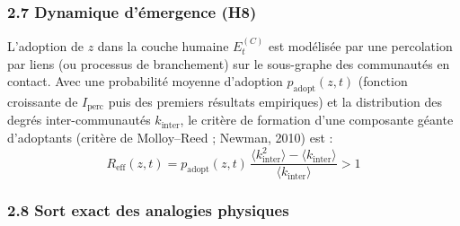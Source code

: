 \documentclass[a4paper,11pt]{article}
\begin{document}
\subsubsection*{2.7 Dynamique d'émergence (H8)}

L'adoption de \(z\) dans la couche humaine \(E_t^{(C)}\) est modélisée
par une percolation par liens (ou processus de branchement) sur le
sous-graphe des communautés en contact. Avec une probabilité moyenne
d'adoption \(p_{\mathrm{adopt}}(z,t)\) (fonction croissante de
\(I_{\mathrm{perc}}\) puis des premiers résultats empiriques) et la
distribution des degrés inter-communautés \(k_{\mathrm{inter}}\), le
critère de formation d'une composante géante d'adoptants (critère de
Molloy--Reed ; Newman, 2010) est :
\[R_{\mathrm{eff}}(z,t) = p_{\mathrm{adopt}}(z,t)\,\frac{\langle k_{\mathrm{inter}}^2 \rangle - \langle k_{\mathrm{inter}} \rangle}{\langle k_{\mathrm{inter}} \rangle} > 1\]

\subsubsection*{2.8 Sort exact des analogies physiques}
\end{document}
